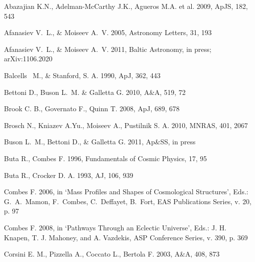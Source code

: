 \documentclass[useAMS,usenatbib]{mn2e}
\begin{document}
\begin{thebibliography}{}

Abazajian K.N., Adelman-McCarthy J.K., Agueros M.A. et al. 2009,
ApJS, 182, 543

 Afanasiev  V.~L., \& Moiseev  A.~V.   2005, Astronomy Letters, 31, 193

 Afanasiev  V.~L., \& Moiseev  A.~V. 2011, Baltic Astronomy, in press;  arXiv:1106.2020



Balcells ~M., \& Stanford, S. A. 1990, ApJ, 362, 443


Bettoni D.,  Buson L.~M. \& Galletta G. 2010, A\&A, 519, 72


 Brook C. B.,   Governato  F., Quinn T. 2008, ApJ, 689, 678

 Brosch N.,   Kniazev A.Yu., Moiseev A.,  Pustilnik S. A. 2010, MNRAS, 401, 2067


 Buson L.~M., Bettoni D.,  \& Galletta G. 2011, Ap\&SS, in press


Buta R., Combes F. 1996,   Fundamentals of Cosmic Physics,  17, 95

Buta  R., Crocker D. A. 1993, AJ, 106, 939

Combes F.  2006, in `Mass Profiles and Shapes of Cosmological Structures',
Eds.: G.~A.~Mamon, F.~Combes, C.~Deffayet, B.~Fort, EAS Publications Series, v. 20, p. 97

Combes F.  2008, in `Pathways Through an Eclectic Universe', Eds.: J. H.  Knapen, T. J. Mahoney,
and A. Vazdekis, ASP Conference Series, v. 390, p. 369

Corsini  E. M., Pizzella  A., Coccato  L., Bertola  F. 2003, A\&A, 408, 873


\end{thebibliography}
\end{document}
